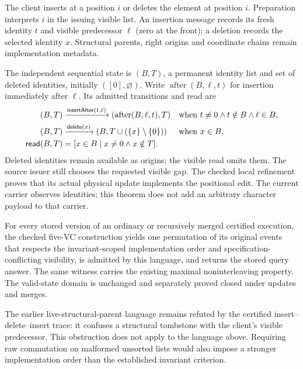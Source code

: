 \begin{example}\label{ex:fugue}
The client inserts at a position $i$ or deletes the element at position $i$.
Preparation interprets $i$ in the issuing visible list. An insertion message
records its fresh identity $t$ and visible predecessor $\ell$ (zero at the
front); a deletion records the selected identity $x$. Structural parents,
right origins and coordinate chains remain implementation metadata.

The independent sequential state is $(B,T)$, a permanent identity list and
set of deleted identities, initially $([0],\varnothing)$. Write
$\operatorname{after}(B,\ell,t)$ for insertion immediately after $\ell$.
Its admitted transitions and read are
\[
\begin{aligned}
 (B,T)&\xrightarrow{\mathsf{insertAfter}(t,\ell)}
 (\operatorname{after}(B,\ell,t),T)
 &&\text{when }t\ne0\land t\notin B\land\ell\in B,\\
 (B,T)&\xrightarrow{\mathsf{delete}(x)}(B,T\cup(\{x\}\setminus\{0\}))
 &&\text{when }x\in B,\\
 \mathsf{read}(B,T)&=[x\in B\mid x\ne0\land x\notin T].
\end{aligned}
\]
Deleted identities remain available as origins; the visible read omits them.
The source issuer still chooses the requested visible gap. The checked local
refinement proves that its actual physical update implements the positional
edit. The current carrier observes identities; this theorem does not add an
arbitrary character payload to that carrier.

For every stored version of an ordinary or recursively merged certified
execution, the checked five-VC construction yields one permutation of its
original events that respects the invariant-scoped implementation order and
specification-conflicting visibility, is admitted by this language, and returns
the stored query answer. The same witness carries the existing maximal
noninterleaving property. The valid-state domain is unchanged and separately
proved closed under updates and merges.

The earlier live-structural-parent language remains refuted by the certified
insert--delete--insert trace: it confuses a structural tombstone with the
client's visible predecessor. This obstruction does not apply to the language
above. Requiring raw commutation on malformed unsorted lists would also impose
a stronger implementation order than the established invariant criterion.
\end{example}

